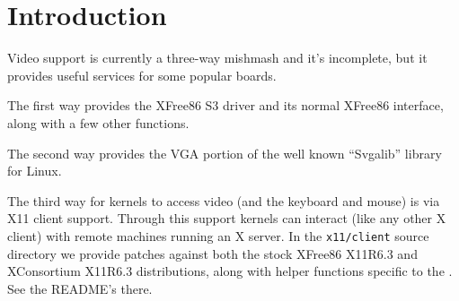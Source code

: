 %
% 
%
\label{video}

\section{Introduction}

Video support is currently a three-way mishmash and it's incomplete, but it
provides useful services for some popular boards.

The first way provides the XFree86 S3 driver and its normal XFree86
interface, along with a few other functions.

The second way provides the VGA portion of the well known ``Svgalib''
library for Linux.

The third way for \oskit{} kernels to access video (and the keyboard and
mouse) is via X11 client support.  Through this support \oskit{} kernels
can interact (like any other X client) with remote machines running an
X server.  In the {\tt x11/client} source directory we provide patches against
both the stock XFree86 X11R6.3 and XConsortium X11R6.3 distributions,
along with helper functions specific to the \oskit.  See the README's there.




